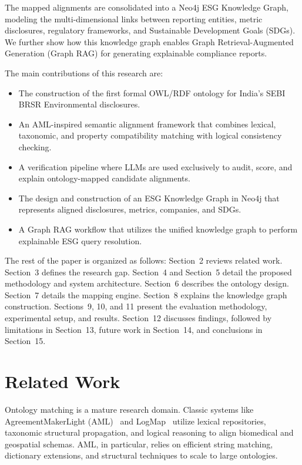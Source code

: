 \documentclass[journal,compsoc]{IEEEtran}
\begin{document}
\begin{itemize}
The mapped alignments are consolidated into a Neo4j ESG Knowledge Graph, modeling the multi-dimensional links between reporting entities, metric disclosures, regulatory frameworks, and Sustainable Development Goals (SDGs). We further show how this knowledge graph enables Graph Retrieval-Augmented Generation (Graph RAG) for generating explainable compliance reports.

The main contributions of this research are:
\begin{itemize}
    \item The construction of the first formal OWL/RDF ontology for India's SEBI BRSR Environmental disclosures.
    \item An AML-inspired semantic alignment framework that combines lexical, taxonomic, and property compatibility matching with logical consistency checking.
    \item A verification pipeline where LLMs are used exclusively to audit, score, and explain ontology-mapped candidate alignments.
    \item The design and construction of an ESG Knowledge Graph in Neo4j that represents aligned disclosures, metrics, companies, and SDGs.
    \item A Graph RAG workflow that utilizes the unified knowledge graph to perform explainable ESG query resolution.
\end{itemize}

The rest of the paper is organized as follows: Section~2 reviews related work. Section~3 defines the research gap. Section~4 and Section~5 detail the proposed methodology and system architecture. Section~6 describes the ontology design. Section~7 details the mapping engine. Section~8 explains the knowledge graph construction. Sections~9, 10, and 11 present the evaluation methodology, experimental setup, and results. Section~12 discusses findings, followed by limitations in Section~13, future work in Section~14, and conclusions in Section~15.

\section{Related Work}
Ontology matching is a mature research domain. Classic systems like AgreementMakerLight (AML)~\cite{aml2013} and LogMap~\cite{logmap2011} utilize lexical repositories, taxonomic structural propagation, and logical reasoning to align biomedical and geospatial schemas. AML, in particular, relies on efficient string matching, dictionary extensions, and structural techniques to scale to large ontologies.


\end{itemize}
\end{document}
